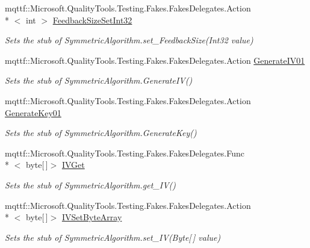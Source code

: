\begin{DoxyCompactItemize}
mqttf\-::\-Microsoft.\-Quality\-Tools.\-Testing.\-Fakes.\-Fakes\-Delegates.\-Action\\*
$<$ int $>$ \hyperlink{class_system_1_1_security_1_1_cryptography_1_1_fakes_1_1_stub_symmetric_algorithm_a65edd7fa57a2c9b6cdc229d5095c477a}{Feedback\-Size\-Set\-Int32}
\begin{DoxyCompactList}\small\item\em Sets the stub of Symmetric\-Algorithm.\-set\-\_\-\-Feedback\-Size(\-Int32 value)\end{DoxyCompactList}\item 
mqttf\-::\-Microsoft.\-Quality\-Tools.\-Testing.\-Fakes.\-Fakes\-Delegates.\-Action \hyperlink{class_system_1_1_security_1_1_cryptography_1_1_fakes_1_1_stub_symmetric_algorithm_a207b36bd88675b77b54fa73b8a815080}{Generate\-I\-V01}
\begin{DoxyCompactList}\small\item\em Sets the stub of Symmetric\-Algorithm.\-Generate\-I\-V()\end{DoxyCompactList}\item 
mqttf\-::\-Microsoft.\-Quality\-Tools.\-Testing.\-Fakes.\-Fakes\-Delegates.\-Action \hyperlink{class_system_1_1_security_1_1_cryptography_1_1_fakes_1_1_stub_symmetric_algorithm_a970fe270162e55fce3199b3cc08b8662}{Generate\-Key01}
\begin{DoxyCompactList}\small\item\em Sets the stub of Symmetric\-Algorithm.\-Generate\-Key()\end{DoxyCompactList}\item 
mqttf\-::\-Microsoft.\-Quality\-Tools.\-Testing.\-Fakes.\-Fakes\-Delegates.\-Func\\*
$<$ byte\mbox{[}$\,$\mbox{]}$>$ \hyperlink{class_system_1_1_security_1_1_cryptography_1_1_fakes_1_1_stub_symmetric_algorithm_a959c385e4b9e8464669d30e76ad59537}{I\-V\-Get}
\begin{DoxyCompactList}\small\item\em Sets the stub of Symmetric\-Algorithm.\-get\-\_\-\-I\-V()\end{DoxyCompactList}\item 
mqttf\-::\-Microsoft.\-Quality\-Tools.\-Testing.\-Fakes.\-Fakes\-Delegates.\-Action\\*
$<$ byte\mbox{[}$\,$\mbox{]}$>$ \hyperlink{class_system_1_1_security_1_1_cryptography_1_1_fakes_1_1_stub_symmetric_algorithm_a3ad047eaa1e5320c17168e9c024c5ab9}{I\-V\-Set\-Byte\-Array}
\begin{DoxyCompactList}\small\item\em Sets the stub of Symmetric\-Algorithm.\-set\-\_\-\-I\-V(\-Byte\mbox{[}$\,$\mbox{]} value)\end{DoxyCompactList}\item 

\end{DoxyCompactItemize}
